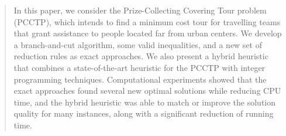 \documentclass{singlecol-new}
\theoremstyle{TH}{
\newtheorem{lemma}{Lemma}
\newtheorem{theorem}[lemma]{Theorem}
\newtheorem{corrolary}[lemma]{Corrolary}
\newtheorem{conjecture}[lemma]{Conjecture}
\newtheorem{proposition}[lemma]{Proposition}
\newtheorem{claim}[lemma]{Claim}
\newtheorem{stheorem}[lemma]{Wrong Theorem}
}
\theoremstyle{THrm}{
\newtheorem{definition}{Definition}[section]
\newtheorem{question}{Question}[section]
\newtheorem{remark}{Remark}
\newtheorem{scheme}{Scheme}
}
\theoremstyle{THhit}{
\newtheorem{case}{Case}[section]
}
\begin{document}
\begin{abstract}
In this paper, we consider the   Prize-Collecting Covering Tour problem (PCCTP), which intends to find a minimum cost tour for travelling teams that grant assistance to people located far from urban centers. We develop a branch-and-cut algorithm, some valid inequalities, and a new set of reduction rules as exact approaches. We also present a hybrid heuristic that combines a state-of-the-art heuristic for the PCCTP  with  integer programming techniques. Computational experiments showed that the exact approaches  found several new optimal solutions while reducing CPU time, and the hybrid heuristic was able to match or improve the solution quality for many instances, along with a significant reduction of running time.
\end{abstract}


\end{document}
